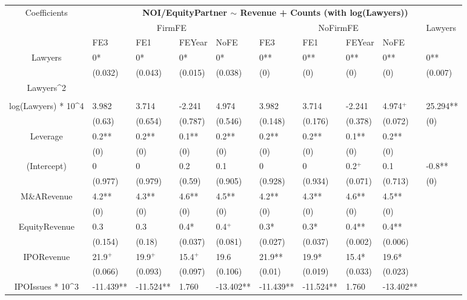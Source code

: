 \documentclass{article}
\begin{document}
\begin{table}[H]
\end{table}


\begin{table}[H]
\centering
\begin{tabular}{|clllllllll|}
\hline
\multirow{3}{*}{Coefficients} & \multicolumn{9}{c|}{\textbf{NOI/EquityPartner $\sim$ Revenue + Counts (with log(Lawyers))}} \\
\cline{2-10}
& \multicolumn{4}{c}{FirmFE} & \multicolumn{4}{c}{NoFirmFE} & \multirow{2}{*}{Lawyers} \\
\cline{2-9}
& FE3 & FE1 & FEYear & NoFE & FE3 & FE1 & FEYear & NoFE &  \\
\hline
 
Lawyers & 0* & 0* & 0* & 0* & 0** & 0** & 0** & 0** & 0** \\ 
   & (0.032) & (0.043) & (0.015) & (0.038) & (0) & (0) & (0) & (0) & (0.007) \\ 
  Lawyers^2 &  &  &  &  &  &  &  &  &  \\ 
   &  &  &  &  &  &  &  &  &  \\ 
  log(Lawyers) * 10^4 & 3.982 & 3.714 & -2.241 & 4.974 & 3.982 & 3.714 & -2.241 & 4.974$^{+}$ & 25.294** \\ 
   & (0.63) & (0.654) & (0.787) & (0.546) & (0.148) & (0.176) & (0.378) & (0.072) & (0) \\ 
  Leverage & 0.2** & 0.2** & 0.1** & 0.2** & 0.2** & 0.2** & 0.1** & 0.2** &  \\ 
   & (0) & (0) & (0) & (0) & (0) & (0) & (0) & (0) &  \\ 
  (Intercept) & 0 & 0 & 0.2 & 0.1 & 0 & 0 & 0.2$^{+}$ & 0.1 & -0.8** \\ 
   & (0.977) & (0.979) & (0.59) & (0.905) & (0.928) & (0.934) & (0.071) & (0.713) & (0) \\ 
  M\&ARevenue & 4.2** & 4.3** & 4.6** & 4.5** & 4.2** & 4.3** & 4.6** & 4.5** &  \\ 
   & (0) & (0) & (0) & (0) & (0) & (0) & (0) & (0) &  \\ 
  EquityRevenue & 0.3 & 0.3 & 0.4* & 0.4$^{+}$ & 0.3* & 0.3* & 0.4** & 0.4** &  \\ 
   & (0.154) & (0.18) & (0.037) & (0.081) & (0.027) & (0.037) & (0.002) & (0.006) &  \\ 
  IPORevenue & 21.9$^{+}$ & 19.9$^{+}$ & 15.4$^{+}$ & 19.6 & 21.9** & 19.9* & 15.4* & 19.6* &  \\ 
   & (0.066) & (0.093) & (0.097) & (0.106) & (0.01) & (0.019) & (0.033) & (0.023) &  \\ 
  IPOIssues * 10^3 & -11.439** & -11.524** & 1.760 & -13.402** & -11.439** & -11.524** & 1.760 & -13.402** &  \\ 

\end{tabular}
\end{table}
\end{document}
